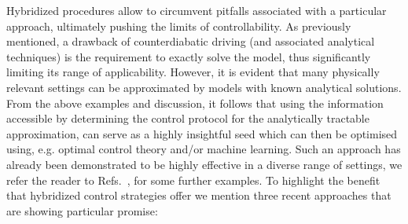 Hybridized procedures allow to circumvent pitfalls associated with a particular approach, ultimately pushing the limits of controllability. As previously mentioned, a drawback of counterdiabatic driving (and associated analytical techniques) is the requirement to exactly solve the model, thus significantly limiting its range of applicability. However, it is evident that many physically relevant settings can be approximated by models with known analytical solutions. From the above examples and discussion, it follows that using the information accessible by determining the control protocol for the analytically tractable approximation, can serve as a highly insightful seed which can then be optimised using, e.g. optimal control theory and/or machine learning. Such an approach has already been demonstrated to be highly effective in a diverse range of settings, we refer the reader to Refs.~\cite{Hegade2022portfolio,Chandarana2023digitized,wurtz2022counterdiabaticity,yao2021reinforcement, Ref1}, for some further examples. 
To highlight the benefit that hybridized control strategies offer we mention three recent approaches that are showing particular promise: 
